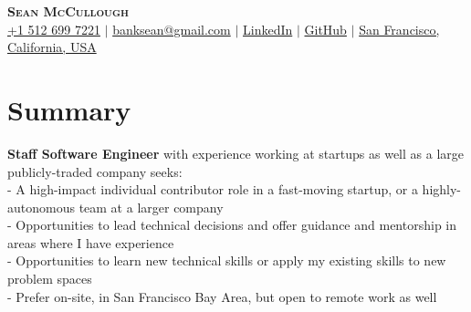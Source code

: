 \documentclass[letterpaper,11pt]{article}
\newcommand{\resumeSubHeadingListStart}{\begin{itemize}[leftmargin=0.15in, label={}]}
\newcommand{\resumeSubHeadingListEnd}{\end{itemize}}
\begin{document}

\begin{center}
    \textbf{\Huge \scshape Sean McCullough} \\ \vspace{3pt}
    \small
    \faMobile \hspace{.5pt} \href{tel:15126997221}{+1 512 699 7221}
    $|$
    \faAt \hspace{.5pt} \href{mailto:banksean@gmail.com}{banksean@gmail.com}
    $|$
    \faLinkedinSquare \hspace{.5pt} \href{https://www.linkedin.com/in/seanmccullough/}{LinkedIn}
    $|$
    \faGithub \hspace{.5pt} \href{https://github.com/banksean}{GitHub}
    $|$
    \faMapMarker \hspace{.5pt} \href{https://maps.app.goo.gl/qZ2iPhKzdnsEXERw8}{San Francisco, California, USA}
\end{center}


\section{Summary}
\vspace{2pt}
\resumeSubHeadingListStart
  \small{\item{
      \textbf{Staff Software Engineer}{ with experience working at startups as well as a large publicly-traded company seeks:} \\ \vspace{3pt}
      \textbf{}{- A high-impact individual contributor role in a fast-moving startup, or a highly-autonomous team at a larger company} \\ \vspace{3pt}
      \textbf{}{- Opportunities to lead technical decisions and offer guidance and mentorship in areas where I have experience } \\ \vspace{3pt}
      \textbf{}{- Opportunities to learn new technical skills or apply my existing skills to new problem spaces } \\ \vspace{3pt}
      \textbf{}{- Prefer on-site, in San Francisco Bay Area, but open to remote work as well}
  }}
\resumeSubHeadingListEnd


\end{document}
